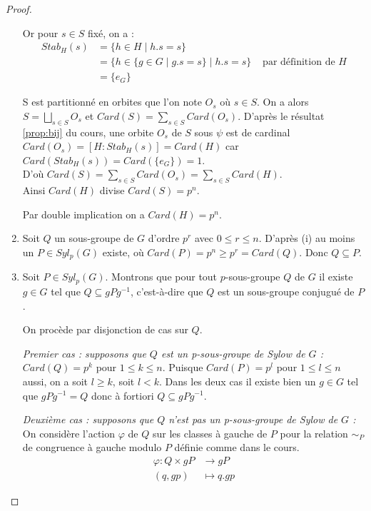 \documentclass{article}
\theoremstyle{definition}
\theoremstyle{plain}
\theoremstyle{plain}
\theoremstyle{plain}
\theoremstyle{plain}
\theoremstyle{definition}
\theoremstyle{plain}
\theoremstyle{plain}
\begin{document}
\begin{proof}
\begin{enumerate}[label={\upshape(\roman*)}]
Or pour \( s \in S \) fixé, on a :
\begin{align*}
	Stab_{H}({s}) &= \{ h \in H \mid h.s = s \} \\ 
		      &= \{ h \in \{g \in G \mid g.s = s \} \mid h.s = s \} &\text{ par définition de } H\\
	&= \{e_{G}\} 
\end{align*}

S est partitionné en orbites que l'on note \( O_s \) où \( s \in S \). On a alors \( S = \bigsqcup_{s \in S} O_{s} \) et \( Card(S) = \sum_{s \in S} Card(O_{s}) \).
D'après le résultat \ref{prop:bij} du cours, une orbite \( O_s \) de \( S \) sous \( \psi \) est de cardinal \( Card(O_s) = [H : Stab_{H}({s}) ] = Card(H) \) car \( Card(Stab_{H}({s})) = Card(\{e_{G}\}) = 1 \). \\
D'où \( Card(S) = \sum_{s \in S} Card(O_{s}) = \sum_{s \in S} Card(H) \).\\ 
Ainsi \( Card(H) \) divise \( Card(S) = p^{n} \). 

Par double implication on a \( Card(H) = p^{n} \).

\item Soit \( Q \) un sous-groupe de \( G \) d'ordre \( p^{r} \) avec \( 0 \leq r \leq n \). 
D'après (i) au moins un \( P \in Syl_p(G) \) existe, où \( Card(P) = p^{n} \geq p ^{r} = Card(Q) \).
Donc \( Q \subseteq P \).

\item Soit \( P \in Syl_{p}({G}) \). Montrons que pour tout \(p\)-sous-groupe \( Q \) de \( G \) il existe \( g \in G \) tel que \( Q \subseteq gPg^{-1} \), c'est-à-dire que \( Q \) est un sous-groupe conjugué de \( P \). 

	On procède par disjonction de cas sur \( Q \).
	\par \textit{Premier cas : supposons que \( Q \) est un p-sous-groupe de Sylow de \( G \) :}\\
	\( Card(Q) = p^{k}\) pour \( 1 \le k \le n \). Puisque \( Card(P) = p^{l}\) pour 
	\( 1 \le l \le n \) aussi, on a soit \( l \ge k \), soit \( l < k \). Dans les 
	deux cas il existe bien un \( g \in G \) tel que 
	\( gPg^{-1} = Q \) donc à fortiori \( Q \subseteq gPg^{-1} \).
	
	\par \textit{Deuxième cas : supposons que \( Q \) n'est pas un p-sous-groupe de Sylow de \( G \) :}\\ On considère l'action \( \varphi \) de \( Q \) sur les classes à gauche de \( P \) pour la relation \( \sim_{P} \) de congruence à gauche modulo \( P \) définie comme dans le cours. 
\begin{align*}
	\varphi : Q \times gP &\to gP \\
	(q,gp) &\mapsto q.gp
\end{align*}


\end{enumerate}
\end{proof}
\end{document}
